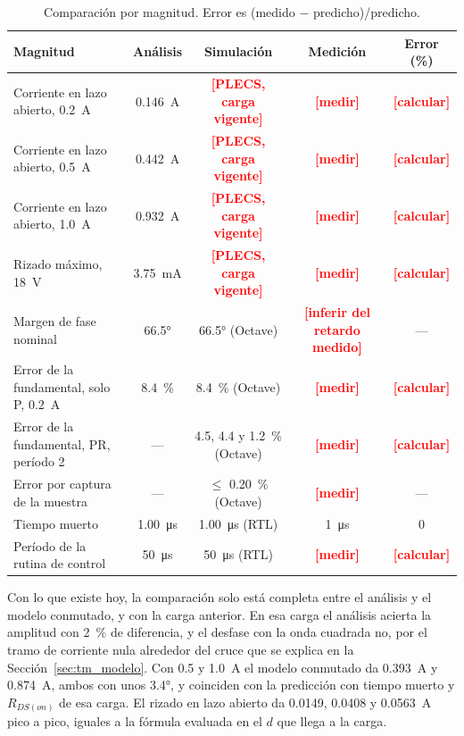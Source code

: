 \documentclass[journal]{IEEEtran}
\newcommand{\pendiente}[1]{\textcolor{red}{\textbf{[#1]}}}
\begin{document}
\begin{table}[!t]
	\centering
	\caption{Comparación por magnitud. Error es (medido $-$ predicho)/predicho.}
	\label{tab:cmp}
	\begin{tabular}{lcccc}
		\toprule
		Magnitud & Análisis & Simulación & Medición & Error (\%) \\
		\midrule
		Corriente en lazo abierto, \SI{0.2}{A} & \SI{0.146}{A} & \pendiente{PLECS, carga vigente} & \pendiente{medir} & \pendiente{calcular} \\
		Corriente en lazo abierto, \SI{0.5}{A} & \SI{0.442}{A} & \pendiente{PLECS, carga vigente} & \pendiente{medir} & \pendiente{calcular} \\
		Corriente en lazo abierto, \SI{1.0}{A} & \SI{0.932}{A} & \pendiente{PLECS, carga vigente} & \pendiente{medir} & \pendiente{calcular} \\
		Rizado máximo, \SI{18}{V} & \SI{3.75}{mA} & \pendiente{PLECS, carga vigente} & \pendiente{medir} & \pendiente{calcular} \\
		Margen de fase nominal & \ang{66.5} & \ang{66.5} (Octave) & \pendiente{inferir del retardo medido} & --- \\
		Error de la fundamental, solo P, \SI{0.2}{A} & \SI{8.4}{\percent} & \SI{8.4}{\percent} (Octave) & \pendiente{medir} & \pendiente{calcular} \\
		Error de la fundamental, PR, período 2 & --- & \num{4.5}, \num{4.4} y \SI{1.2}{\percent} (Octave) & \pendiente{medir} & \pendiente{calcular} \\
		Error por captura de la muestra & --- & $\le$ \SI{0.20}{\percent} (Octave) & \pendiente{medir} & --- \\
		Tiempo muerto & \SI{1.00}{\micro s} & \SI{1.00}{\micro s} (RTL) & \SI{1}{\micro s} & \num{0} \\
		Período de la rutina de control & \SI{50}{\micro s} & \SI{50}{\micro s} (RTL) & \pendiente{medir} & \pendiente{calcular} \\
		\bottomrule
	\end{tabular}
\end{table}

Con lo que existe hoy, la comparación solo está completa entre el análisis y el modelo conmutado, y con la carga anterior. En esa carga el análisis acierta la amplitud con \SI{2}{\percent} de diferencia, y el desfase con la onda cuadrada no, por el tramo de corriente nula alrededor del cruce que se explica en la Sección~\ref{sec:tm_modelo}. Con \num{0.5} y \SI{1.0}{A} el modelo conmutado da \SI{0.393}{A} y \SI{0.874}{A}, ambos con unos \ang{3.4}, y coinciden con la predicción con tiempo muerto y $R_{DS(on)}$ de esa carga. El rizado en lazo abierto da \num{0.0149}, \num{0.0408} y \SI{0.0563}{A} pico a pico, iguales a la fórmula evaluada en el $d$ que llega a la carga.
\end{document}
